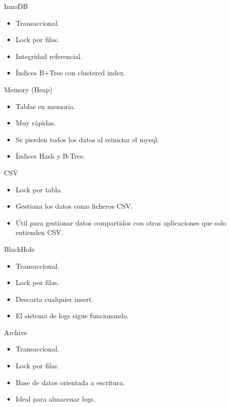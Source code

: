 \begin{frame}{InnoDB}
  \begin{itemize}
    \item Transaccional.
    \item Lock por filas.
    \item Integridad referencial.
    \item Índices B+Tree con clustered index.
  \end{itemize}
\end{frame}

\begin{frame}{Memory (Heap)}
  \begin{itemize}
    \item Tablas en memoria.
    \item Muy rápidas.
    \item Se pierden todos los datos al reiniciar el mysql.
    \item Índices Hash y B-Tree.
  \end{itemize}
\end{frame}

\begin{frame}{CSV}
  \begin{itemize}
    \item Lock por tabla.
    \item Gestiona los datos como ficheros CSV.
    \item Útil para gestionar datos compartidos con otras aplicaciones que solo entienden CSV.
  \end{itemize}
\end{frame}

\begin{frame}{BlackHole}
  \begin{itemize}
    \item Transaccional.
    \item Lock por filas.
    \item Descarta cualquier insert.
    \item El sistema de logs sigue funcionando.
  \end{itemize}
\end{frame}

\begin{frame}{Archive}
  \begin{itemize}
    \item Transaccional.
    \item Lock por filas.
    \item Base de datos orientada a escritura.
    \item Ideal para almacenar logs.
  \end{itemize}
\end{frame}


